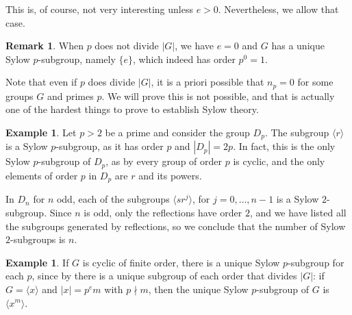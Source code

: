 \documentclass[12pt]{report}
\numberwithin{equation}{section}
\numberwithin{theorem}{chapter}
\theoremstyle{definition}
\newtheorem{example}[theorem]{Example}
\newtheorem*{basic properties}{Basic Properties}
\newtheorem*{Important Remark}{Important Remark}
\newtheorem{remark}[theorem]{Remark}
\begin{document}
This is, of course, not very interesting unless $e>0$. Nevertheless, we allow that case.

\begin{remark}\label{remark e Sylow}
When $p$ does not divide $|G|$, we have $e = 0$ and $G$ has a unique Sylow $p$-subgroup, namely $\{e\}$, which indeed has order $p^0=1$.
\end{remark}



Note that even if $p$ does divide $|G|$, it is a priori possible that $n_p = 0$ for some groups $G$ and primes $p$. We will prove this is not possible, and that is actually one of the hardest things to prove to establish Sylow theory. 

\begin{example} 
Let $p>2$ be a prime and consider the group $D_p$.
The subgroup $\langle r \rangle$ is a Sylow $p$-subgroup, as it has order $p$ and $|D_p|=2p$. In fact, this is the only Sylow $p$-subgroup of $D_{p}$, as by  every group of order $p$ is cyclic, and the only elements of order $p$ in $D_p$ are $r$ and its powers. %

In $D_{n}$ for $n$ odd, each of the subgroups $\langle sr^j \rangle$, for $j = 0, \dots, n-1$ is a Sylow $2$-subgroup. Since $n$ is odd, only the reflections have order $2$, and we have listed all the subgroups generated by reflections, so we conclude that the number of Sylow $2$-subgroups is $n$.	
\end{example}



\begin{example} 
If $G$ is cyclic of finite order, there is a unique Sylow $p$-subgroup for each $p$, since by  there is a unique subgroup of each order that divides $|G|$: if $G = \langle x \rangle$ and $|x| = p^e m$ with $p \nmid m$, then the unique Sylow $p$-subgroup of $G$ is $\langle x^m \rangle$.	
\end{example}

%
%
%
%
\end{document}

